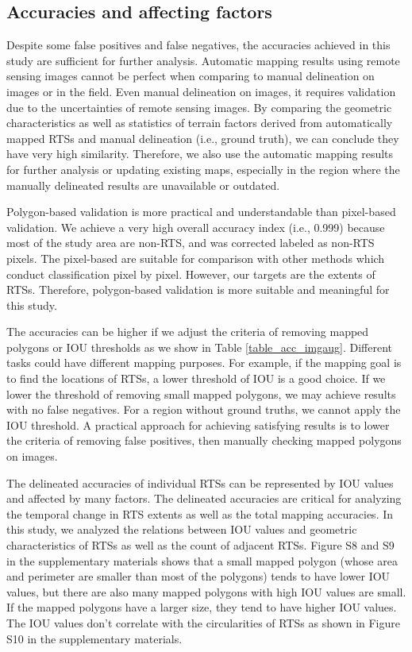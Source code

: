\documentclass[preprint,12pt,authoryear]{elsarticle}
\begin{document}
\subsection{Accuracies and affecting factors}
\label{subsec_acc_factors}

Despite some false positives and false negatives, the accuracies achieved in this study are sufficient for further analysis. Automatic mapping results using remote sensing images cannot be perfect when comparing to manual delineation on images or in the field. Even manual delineation on images, it requires validation due to the uncertainties of remote sensing images. By comparing the geometric characteristics as well as statistics of terrain factors derived from automatically mapped RTSs and manual delineation (i.e., ground truth), we can conclude they have very high similarity. Therefore, we also use the automatic mapping results for further analysis or updating existing maps, especially in the region where the manually delineated results are unavailable or outdated. 

Polygon-based validation is more practical and understandable than pixel-based validation. We achieve a very high overall accuracy index (i.e., 0.999) because most of the study area are non-RTS, and was corrected labeled as non-RTS pixels. The pixel-based are suitable for comparison with other methods which conduct classification pixel by pixel. However, our targets are the extents of RTSs. Therefore, polygon-based validation is more suitable and meaningful for this study.

The accuracies can be higher if we adjust the criteria of removing mapped polygons or IOU thresholds as we show in Table \ref{table_acc_imgaug}. Different tasks could have different mapping purposes. For example, if the mapping goal is to find the locations of RTSs, a lower threshold of IOU is a good choice. If we lower the threshold of removing small mapped polygons, we may achieve results with no false negatives. For a region without ground truths, we cannot apply the IOU threshold. A practical approach for achieving satisfying results is to lower the criteria of removing false positives, then manually checking mapped polygons on images. 

The delineated accuracies of individual RTSs can be represented by IOU values and affected by many factors. The delineated accuracies are critical for analyzing the temporal change in RTS extents as well as the total mapping accuracies. In this study, we analyzed the relations between IOU values and geometric characteristics of RTSs as well as the count of adjacent RTSs. Figure S8 and S9 in the supplementary materials shows that a small mapped polygon (whose area and perimeter are smaller than most of the polygons) tends to have lower IOU values, but there are also many mapped polygons with high IOU values are small. If the mapped polygons have a larger size, they tend to have higher IOU values. The IOU values don’t correlate with the circularities of RTSs as shown in Figure S10 in the supplementary materials. 
\end{document}
